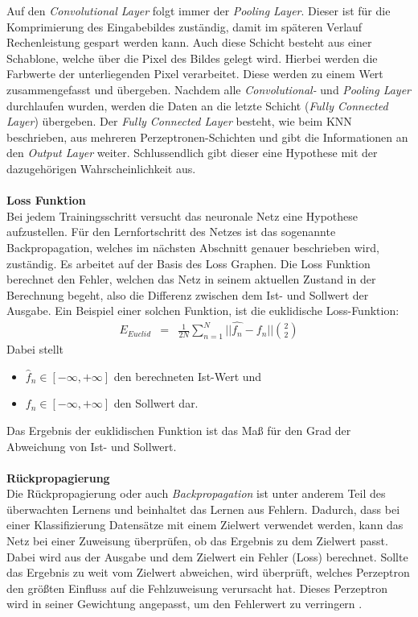 Auf den \textit{Convolutional Layer} folgt immer der \textit{Pooling Layer}. Dieser ist für die Komprimierung des Eingabebildes zuständig, damit im späteren Verlauf Rechenleistung gespart werden kann. Auch diese Schicht besteht aus einer Schablone, welche über die Pixel des Bildes gelegt wird. Hierbei werden die Farbwerte der unterliegenden Pixel verarbeitet. Diese werden zu einem Wert zusammengefasst und übergeben. Nachdem alle \textit{Convolutional-} und \textit{Pooling Layer} durchlaufen wurden, werden die Daten an die letzte Schicht (\textit{Fully Connected Layer}) übergeben. Der \textit{Fully Connected Layer} besteht, wie beim KNN beschrieben, aus mehreren Perzeptronen-Schichten und gibt die Informationen an den \textit{Output Layer} weiter. Schlussendlich gibt dieser eine Hypothese mit der dazugehörigen Wahrscheinlichkeit aus.\\\\
\textbf{Loss Funktion}\\
Bei jedem Trainingsschritt versucht das neuronale Netz eine Hypothese aufzustellen. Für den Lernfortschritt des Netzes ist das sogenannte Backpropagation, welches im nächsten Abschnitt genauer beschrieben wird, zuständig. Es arbeitet auf der Basis des Loss Graphen. Die Loss Funktion berechnet den Fehler, welchen das Netz in seinem aktuellen Zustand in der Berechnung begeht, also die Differenz zwischen dem Ist- und Sollwert der Ausgabe. Ein Beispiel einer solchen Funktion, ist die euklidische Loss-Funktion:
\begin{eqnarray} E_{Euclid}&=&\frac{1}{2N} \sum_{n=1}^N || \hat{f_{n}}-f_{n} || \binom{2}{2} \end{eqnarray}
Dabei stellt
\begin{itemize}
	\item[] $\hat{f}_{n} \in [-\infty,+\infty]$ den berechneten Ist-Wert und
	\item[] $f_{n} \in [-\infty,+\infty]$ den Sollwert dar.
\end{itemize}
Das Ergebnis der euklidischen Funktion ist das Maß für den Grad der Abweichung von Ist- und Sollwert.\\\\
\textbf{Rückpropagierung}\\
Die Rückpropagierung oder auch \textit{Backpropagation} \cite{ertel2013grundkurs} ist unter anderem Teil des überwachten Lernens und beinhaltet das Lernen aus Fehlern. Dadurch, dass bei einer Klassifizierung Datensätze mit einem Zielwert verwendet werden, kann das Netz bei einer Zuweisung überprüfen, ob das Ergebnis zu dem Zielwert passt. Dabei wird aus der Ausgabe und dem Zielwert ein Fehler (Loss) berechnet. Sollte das Ergebnis zu weit vom Zielwert abweichen, wird überprüft, welches Perzeptron den größten Einfluss auf die Fehlzuweisung verursacht hat. Dieses Perzeptron wird in seiner Gewichtung angepasst, um den Fehlerwert zu verringern \cite{goodfellow2016deep}.\\\\  
